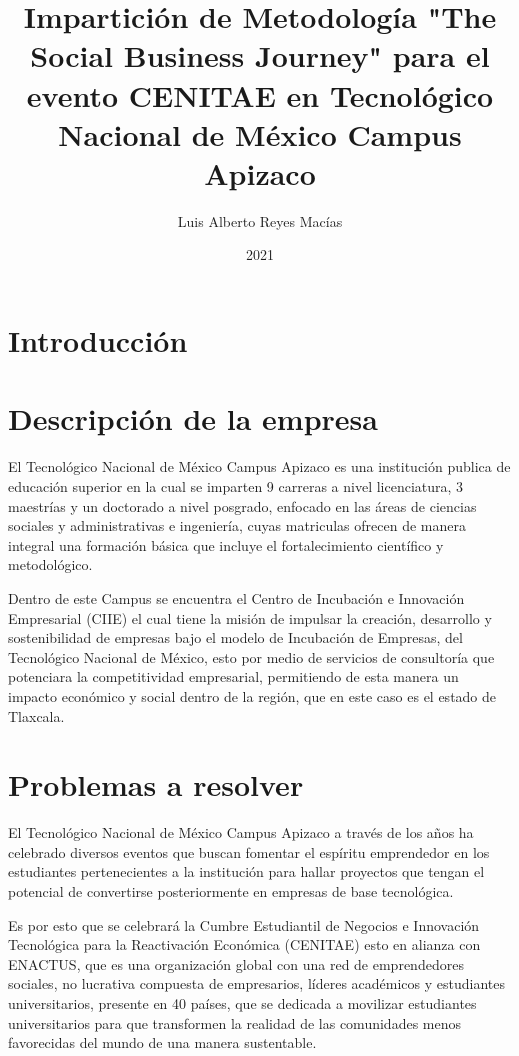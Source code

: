 \documentclass[11pt]{article}
\author{Luis Alberto Reyes Macías}
\date{2021}
\title{Impartición de Metodología "The Social Business Journey" para el evento CENITAE en Tecnológico Nacional de México Campus Apizaco}
\begin{document}
\maketitle

\section{Introducción}
\label{sec:org3482cf4}

\section{Descripción de la empresa}
\label{sec:orgac75187}

El Tecnológico Nacional de México Campus Apizaco es una institución publica de educación superior en la cual se imparten 9 carreras a nivel licenciatura, 3 maestrías y un doctorado a nivel posgrado, enfocado en las áreas de ciencias sociales y administrativas e ingeniería, cuyas matriculas ofrecen de manera integral una formación básica que incluye el fortalecimiento científico y metodológico. 

Dentro de este Campus se encuentra el Centro de Incubación e Innovación Empresarial (CIIE) el cual tiene la misión de impulsar la creación, desarrollo y sostenibilidad de empresas bajo el modelo de Incubación de Empresas, del Tecnológico Nacional de México, esto por medio de servicios de consultoría que potenciara la competitividad empresarial, permitiendo de esta manera un impacto económico y social dentro de la región, que en este caso es el estado de Tlaxcala.

\section{Problemas a resolver}
\label{sec:orgc2cd703}

El Tecnológico Nacional de México Campus Apizaco a través de los años ha celebrado diversos eventos que buscan fomentar el espíritu emprendedor en los estudiantes pertenecientes a la institución para hallar proyectos que tengan el potencial de convertirse posteriormente en empresas de base tecnológica.

Es por esto que se celebrará la Cumbre Estudiantil de Negocios e Innovación Tecnológica para la Reactivación Económica (CENITAE) esto en alianza con ENACTUS, que es una organización global con una red de emprendedores sociales, no lucrativa compuesta de empresarios, líderes académicos y estudiantes universitarios, presente en 40 países, que se dedicada a movilizar estudiantes universitarios para que transformen la realidad de las comunidades menos favorecidas del mundo de una manera sustentable.
\end{document}
